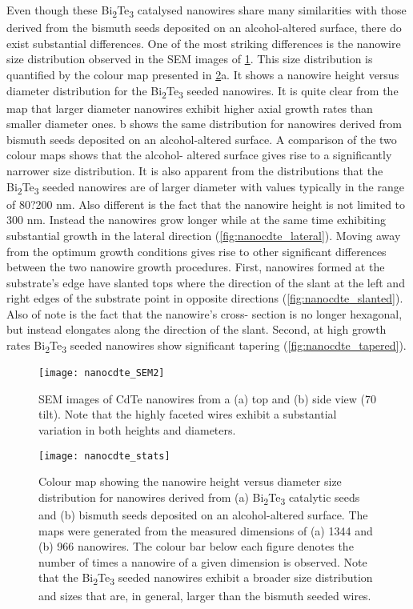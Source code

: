 Even though these Bi\textsubscript{2}Te\textsubscript{3} catalysed nanowires share
many similarities with those derived from the bismuth seeds
deposited on an alcohol-altered surface, there do exist
substantial differences. One of the most striking differences
is the nanowire size distribution observed in the SEM images
of \cref{fig:nanocdte_SEM2}. This size distribution is quantified by the colour
map presented in \cref{fig:nanocdte_stats}a. It shows a nanowire height
versus diameter distribution for the Bi\textsubscript{2}Te\textsubscript{3} seeded nanowires. It is quite clear from the map that larger diameter nanowires exhibit higher axial growth rates than smaller diameter ones. b shows the same distribution for nanowires derived 
from bismuth seeds deposited on an alcohol-altered surface. A 
comparison of the two colour maps shows that the alcohol- 
altered surface gives rise to a significantly narrower size 
distribution. It is also apparent from the distributions that the 
Bi\textsubscript{2}Te\textsubscript{3} seeded nanowires are of larger diameter with values typically in the range of 80?200 nm. Also different is the fact that the nanowire height is not limited to 300 nm. Instead the nanowires grow longer while at the same time exhibiting
substantial growth in the lateral direction (\cref{fig:nanocdte_lateral}).
Moving away from the optimum growth conditions gives
rise to other significant differences between the two nanowire
growth procedures. First, nanowires formed at the substrate's
edge have slanted tops where the direction of the slant at the
left and right edges of the substrate point in opposite directions
(\cref{fig:nanocdte_slanted}). Also of note is the fact that the nanowire's cross-
section is no longer hexagonal, but instead elongates along the
direction of the slant. Second, at high growth rates Bi\textsubscript{2}Te\textsubscript{3}
seeded nanowires show significant tapering (\cref{fig:nanocdte_tapered}).
\begin{figure}
    \centering
    \texttt{[image: nanocdte\_SEM2]}
    \caption[SEM image of CdTe nanowires]{\label{fig:nanocdte_SEM2}SEM images of CdTe nanowires from a (a) top and (b) side view (70\degree{} tilt). Note that the highly faceted wires exhibit a substantial variation in both heights and diameters.}
\end{figure}
\begin{figure}
    \centering
    \texttt{[image: nanocdte\_stats]}
    \caption[CdTe nanowire dimension colourmap]{\label{fig:nanocdte_stats}Colour map showing the nanowire height versus diameter size distribution for nanowires derived from (a) Bi\textsubscript{2}Te\textsubscript{3} catalytic seeds
        and (b) bismuth seeds deposited on an alcohol-altered surface. The maps were generated from the measured dimensions of (a) 1344 and
        (b) 966 nanowires. The colour bar below each figure denotes the number of times a nanowire of a given dimension is observed. Note that the
        Bi\textsubscript{2}Te\textsubscript{3} seeded nanowires exhibit a broader size distribution and sizes that are, in general, larger than the bismuth seeded wires.}
\end{figure}
